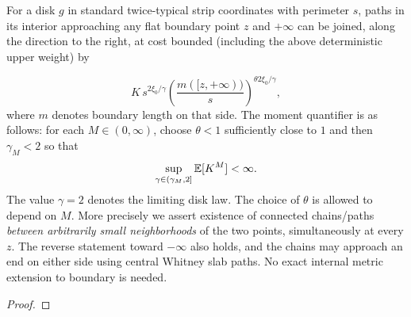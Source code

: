 \begin{proposition}\label{proxy:boundary-chain}

For a disk \(g\) in standard twice-typical strip coordinates with perimeter \(s\), paths in its interior approaching any flat boundary point \(z\) and \(+\infty\) can be joined, along the direction to the right, at cost bounded (including the above deterministic upper weight) by

\begin{equation}
K\,s^{2\xi_0/\gamma}\left(\frac{m([z,+\infty))}{s}\right)^{\theta 2\xi_0/\gamma},
 \label{eq:original-11}
\end{equation}
where $m$ denotes boundary length on that side.  The moment quantifier is as follows: for each $M\in(0,\infty)$, choose $\theta<1$ sufficiently close to $1$ and then $\gamma_M<2$ so that
\[
 \sup_{\gamma\in(\gamma_M,2]}\mathbb E[K^M]<\infty.
\]
The value $\gamma=2$ denotes the limiting disk law.  The choice of $\theta$ is allowed to depend on $M$.
More precisely we assert existence of connected chains/paths \emph{between arbitrarily small neighborhoods} of the two points, simultaneously at every \(z\).
The reverse statement toward \(-\infty\) also holds, and the chains may approach an end on either side using central Whitney slab paths.
No exact internal metric extension to boundary is needed.

\end{proposition}\begin{proof}


\end{proof}
